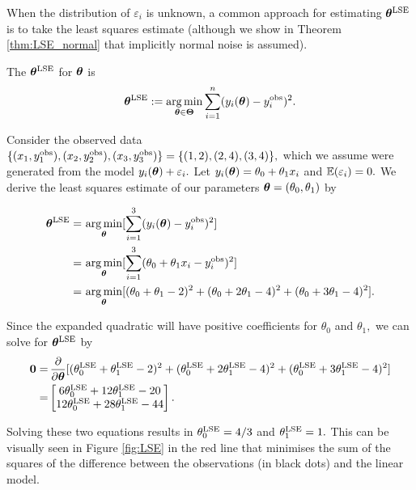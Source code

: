 When the distribution of $\varepsilon_i$ is unknown, a common approach for
estimating $\bm{\theta}^{\mathrm{LSE}}$ is to take the least squares estimate
(although we show in Theorem \ref{thm:LSE_normal} that implicitly normal noise
is assumed).

\begin{definition}
    The  $\bm{\theta}^{\mathrm{LSE}}$ for
    $\bm{\theta}$ is
    $$
        \bm{\theta}^{\mathrm{LSE}}
        := \operatorname*{arg\,min}_{\bm{\theta}\in\mathbf{\Theta}}
        \sum_{i = 1}^n (y_i(\bm{\theta})- y_i^{\mathrm{obs}})^2.
    $$
\end{definition}

\begin{example}\label{ex:LSE}
    Consider the observed data
    $\{(x_1, y_1^{\mathrm{obs}}), (x_2, y_2^{\mathrm{obs}}), (x_3, y_3^{\mathrm{obs}})\}
        = \{(1, 2), (2, 4), (3, 4)\},$
    which we assume were generated from the model
    $y_i(\bm{\theta}) + \varepsilon_i.$ Let
    $y_i(\bm{\theta}) = \theta_0 + \theta_1x_i$ and
    $\operatorname{\mathbb{E}}(\varepsilon_i) = 0.$ We derive the least squares estimate of our
    parameters $\bm{\theta} = (\theta_0, \theta_1)$ by

    \begin{align*}
        \bm{\theta}^{\mathrm{LSE}}
        = & \, \operatorname*{arg\,min}_{\bm{\theta}}
        [\sum_{i = 1}^3 (y_i(\bm{\theta}) - y_i^{\mathrm{obs}})^2]           \\
        = & \, \operatorname*{arg\,min}_{\bm{\theta}}
        [\sum_{i = 1}^3 (\theta_0 + \theta_1x_i - y_i^{\mathrm{obs}})^2] \\
        = & \, \operatorname*{arg\,min}_{\bm{\theta}}
        [(\theta_0 + \theta_1 - 2)^2 + (\theta_0 + 2\theta_1 - 4)^2
            + (\theta_0 + 3\theta_1 - 4)^2].
    \end{align*}

    Since the expanded quadratic will have positive coefficients for
    $\theta_0$ and $\theta_1,$ we can solve for $\bm{\theta}^{\mathrm{LSE}}$
    by
    \begin{align*}
        \mathbf{0}
        = & \, \frac{\partial}{\partial \bm{\theta}}
        [
            (\theta^{\mathrm{LSE}}_0 + \theta^{\mathrm{LSE}}_1 - 2)^2
            + (\theta^{\mathrm{LSE}}_0 + 2\theta^{\mathrm{LSE}}_1 - 4)^2
            + (\theta^{\mathrm{LSE}}_0 + 3\theta^{\mathrm{LSE}}_1 - 4)^2
        ]                                        \\
        = & \begin{bmatrix}
                6\theta^{\mathrm{LSE}}_0 + 12\theta^{\mathrm{LSE}}_1 - 20 \\
                12\theta^{\mathrm{LSE}}_0 + 28\theta^{\mathrm{LSE}}_1 - 44
            \end{bmatrix}.
    \end{align*}

    Solving these two equations results in $\theta^{\mathrm{LSE}}_0 = 4/3$ and
    $\theta^{\mathrm{LSE}}_1 = 1.$ This can be visually seen in Figure \ref{fig:LSE} in
    the red line that minimises the sum of the squares of the difference
    between the observations (in black dots) and the linear model.
\end{example}



